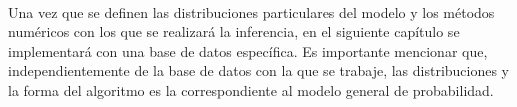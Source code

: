 \\
Una vez que se definen las distribuciones particulares del modelo y los m\'etodos num\'ericos con los que se realizar\'a la inferencia, en el siguiente cap\'itulo se implementar\'a con una base de datos espec\'ifica. Es importante mencionar que, independientemente de la base de datos con la que se trabaje, las distribuciones y la forma del algoritmo es la correspondiente al modelo general de probabilidad.
